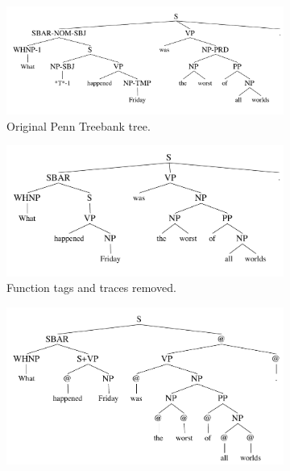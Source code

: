 \begin{figure}
	\centering
  \begin{subfigure}{0.72\textwidth}
		\includegraphics[width=\textwidth]{../figures/trees/original.pdf}
    \caption{Original Penn Treebank tree.}
		\label{fig:tree-original}
	\end{subfigure}
	\begin{subfigure}{0.62\textwidth}
		\includegraphics[width=\textwidth]{../figures/trees/simplified.pdf}
    \caption{Function tags and traces removed.}
		\label{fig:tree-simplified}
	\end{subfigure}
	\begin{subfigure}{0.62\textwidth}
		\includegraphics[width=\textwidth]{../figures/trees/binary.pdf}

\end{subfigure}
\end{figure}
